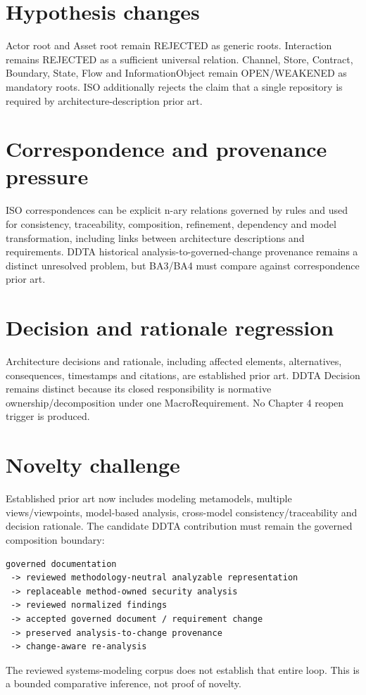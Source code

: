 \documentclass[10pt,a4paper]{article}
\begin{document}
\section{Hypothesis changes}
Actor root and Asset root remain REJECTED as generic roots. Interaction remains REJECTED as a sufficient universal relation. Channel, Store, Contract, Boundary, State, Flow and InformationObject remain OPEN/WEAKENED as mandatory roots. ISO additionally rejects the claim that a single repository is required by architecture-description prior art.
\section{Correspondence and provenance pressure}
ISO correspondences can be explicit n-ary relations governed by rules and used for consistency, traceability, composition, refinement, dependency and model transformation, including links between architecture descriptions and requirements. DDTA historical analysis-to-governed-change provenance remains a distinct unresolved problem, but BA3/BA4 must compare against correspondence prior art.
\section{Decision and rationale regression}
Architecture decisions and rationale, including affected elements, alternatives, consequences, timestamps and citations, are established prior art. DDTA Decision remains distinct because its closed responsibility is normative ownership/decomposition under one MacroRequirement. No Chapter 4 reopen trigger is produced.
\section{Novelty challenge}
Established prior art now includes modeling metamodels, multiple views/viewpoints, model-based analysis, cross-model consistency/traceability and decision rationale. The candidate DDTA contribution must remain the governed composition boundary:
\begin{lstlisting}
governed documentation
 -> reviewed methodology-neutral analyzable representation
 -> replaceable method-owned security analysis
 -> reviewed normalized findings
 -> accepted governed document / requirement change
 -> preserved analysis-to-change provenance
 -> change-aware re-analysis
\end{lstlisting}
The reviewed systems-modeling corpus does not establish that entire loop. This is a bounded comparative inference, not proof of novelty.
\end{document}
